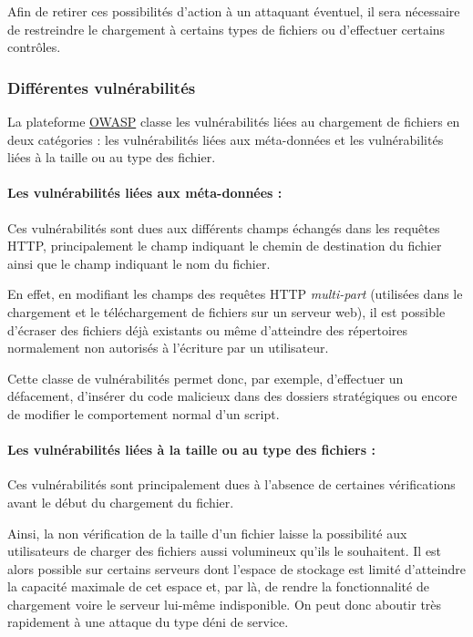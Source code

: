 Afin de retirer ces possibilités d'action à un attaquant éventuel, il sera nécessaire de restreindre le chargement à certains types de fichiers ou d'effectuer certains contrôles.

\subsubsection{Différentes vulnérabilités}

La plateforme \href{http://www.owasp.org}{OWASP} classe les vulnérabilités liées au chargement de fichiers en deux catégories : les vulnérabilités liées aux méta-données et les vulnérabilités liées à la taille ou au type des fichier.

\paragraph{Les vulnérabilités liées aux méta-données :}

Ces vulnérabilités sont dues aux différents champs échangés dans les requêtes HTTP, principalement le champ indiquant le chemin de destination du fichier ainsi que le champ indiquant le nom du fichier.

En effet, en modifiant les champs des requêtes HTTP \textit{multi-part} (utilisées dans le chargement et le téléchargement de fichiers sur un serveur web), il est possible d'écraser des fichiers déjà existants ou même d'atteindre des répertoires normalement non autorisés à l'écriture par un utilisateur.

Cette classe de vulnérabilités permet donc, par exemple, d'effectuer un défacement, d'insérer du code malicieux dans des dossiers stratégiques ou encore de modifier le comportement normal d'un script.

\paragraph{Les vulnérabilités liées à la taille ou au type des fichiers :}

Ces vulnérabilités sont principalement dues à l'absence de certaines vérifications avant le début du chargement du fichier. 

Ainsi, la non vérification de la taille d'un fichier laisse la possibilité aux utilisateurs de charger des fichiers aussi volumineux qu'ils le souhaitent. Il est alors possible sur certains serveurs dont l'espace de stockage est limité d'atteindre la capacité maximale de cet espace et, par là, de rendre la fonctionnalité de chargement voire le serveur lui-même indisponible. On peut donc aboutir très rapidement à une attaque du type déni de service.

